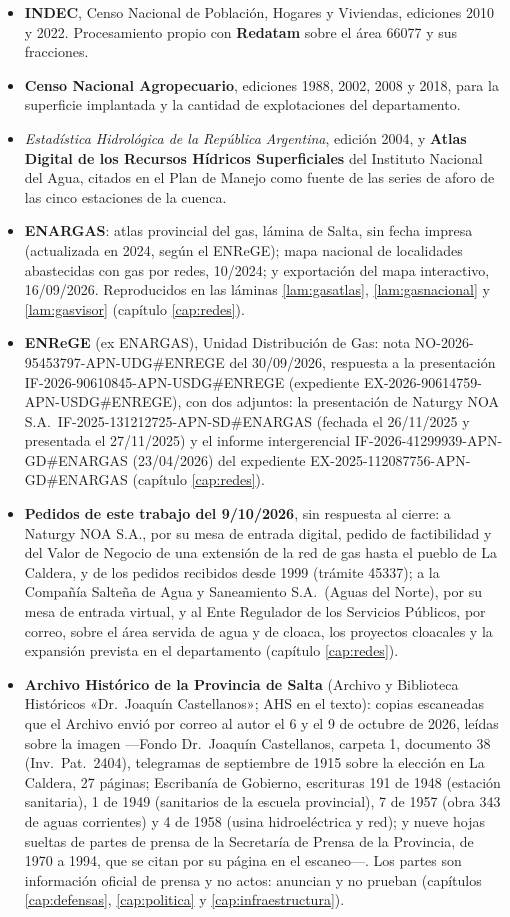 \begin{itemize}[leftmargin=*]
\item \textbf{INDEC}, Censo Nacional de Población, Hogares y Viviendas, ediciones 2010 y
2022. Procesamiento propio con \textbf{Redatam} sobre el área 66077 y sus fracciones.
\item \textbf{Censo Nacional Agropecuario}, ediciones 1988, 2002, 2008 y 2018, para la superficie
implantada y la cantidad de explotaciones del departamento.
\item \textit{Estadística Hidrológica de la República Argentina}, edición 2004, y
\textbf{Atlas Digital de los Recursos Hídricos Superficiales} del Instituto Nacional del
Agua, citados en el Plan de Manejo como fuente de las series de aforo de las cinco estaciones de la cuenca.
\item \textbf{ENARGAS}: atlas provincial del gas, lámina de Salta, sin fecha impresa (actualizada en 2024, según el ENReGE); mapa nacional de localidades abastecidas con gas por redes, 10/2024; y exportación del mapa interactivo, 16/09/2026. Reproducidos en las láminas \ref{lam:gasatlas}, \ref{lam:gasnacional} y \ref{lam:gasvisor} (capítulo \ref{cap:redes}).
\item \textbf{ENReGE} (ex ENARGAS), Unidad Distribución de Gas: nota NO-2026-95453797-APN-UDG\#ENREGE del 30/09/2026, respuesta a la presentación IF-2026-90610845-APN-USDG\#ENREGE (expediente EX-2026-90614759-APN-USDG\#ENREGE), con dos adjuntos: la presentación de Naturgy NOA S.A.\ IF-2025-131212725-APN-SD\#ENARGAS (fechada el 26/11/2025 y presentada el 27/11/2025) y el informe intergerencial IF-2026-41299939-APN-GD\#ENARGAS (23/04/2026) del expediente EX-2025-112087756-APN-GD\#ENARGAS (capítulo \ref{cap:redes}).
\item \textbf{Pedidos de este trabajo del 9/10/2026}, sin respuesta al cierre: a Naturgy NOA S.A., por su mesa de entrada digital, pedido de factibilidad y del Valor de Negocio de una extensión de la red de gas hasta el pueblo de La Caldera, y de los pedidos recibidos desde 1999 (trámite 45337); a la Compañía Salteña de Agua y Saneamiento S.A.\ (Aguas del Norte), por su mesa de entrada virtual, y al Ente Regulador de los Servicios Públicos, por correo, sobre el área servida de agua y de cloaca, los proyectos cloacales y la expansión prevista en el departamento (capítulo \ref{cap:redes}).
\item \textbf{Archivo Histórico de la Provincia de Salta} (Archivo y Biblioteca Históricos «Dr.\ Joaquín Castellanos»; AHS en el texto): copias escaneadas que el Archivo envió por correo al autor el 6 y el 9 de octubre de 2026, leídas sobre la imagen ---Fondo Dr.\ Joaquín Castellanos, carpeta 1, documento 38 (Inv.\ Pat.\ 2404), telegramas de septiembre de 1915 sobre la elección en La Caldera, 27 páginas; Escribanía de Gobierno, escrituras 191 de 1948 (estación sanitaria), 1 de 1949 (sanitarios de la escuela provincial), 7 de 1957 (obra 343 de aguas corrientes) y 4 de 1958 (usina hidroeléctrica y red); y nueve hojas sueltas de partes de prensa de la Secretaría de Prensa de la Provincia, de 1970 a 1994, que se citan por su página en el escaneo---. Los partes son información oficial de prensa y no actos: anuncian y no prueban (capítulos \ref{cap:defensas}, \ref{cap:politica} y \ref{cap:infraestructura}).

\end{itemize}

